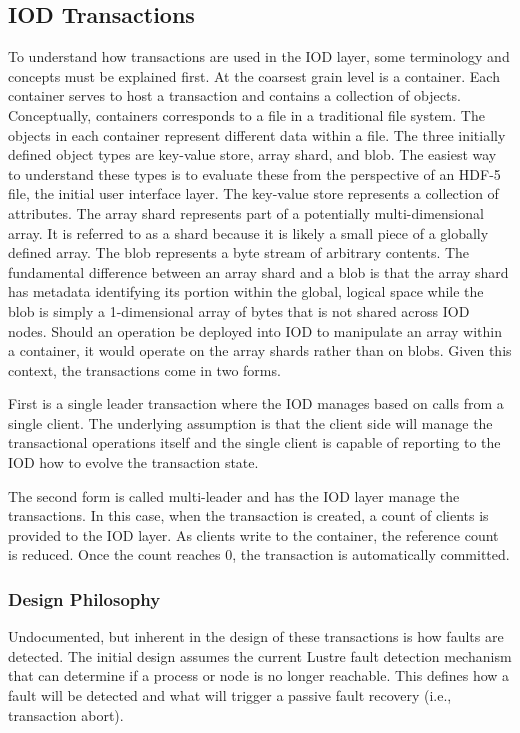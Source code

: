 \documentclass[conference]{IEEEtran}
\begin{document}
\subsection{IOD Transactions}
To understand how transactions are used in the IOD layer, some terminology and
concepts must be explained first. At the coarsest grain level is a container.
Each container serves to host a transaction and contains a collection of
objects. Conceptually, containers corresponds to a file in a traditional file
system. The objects in each container represent different data within a file.
The three initially defined object types are key-value store, array shard,
and blob. The easiest way to understand these types is to evaluate these from
the perspective of an HDF-5 file, the initial user interface layer. The
key-value store represents a collection of attributes. The array shard
represents part of a potentially multi-dimensional array. It is referred to as
a shard because it is likely a small piece of a globally defined array. The
blob represents a byte stream of arbitrary contents.  The fundamental
difference between an array shard and a blob is that the array shard has
metadata identifying its portion within the global, logical space while the
blob is simply a 1-dimensional array of bytes that is not shared across IOD
nodes.  Should an operation be deployed into IOD to manipulate an array within
a container, it would operate on the array shards rather than on blobs. Given
this context, the transactions come in two forms.

First is a single leader transaction where the IOD manages based on calls from
a single client. The underlying assumption is that the client side will manage
the transactional operations itself and the single client is capable of
reporting to the IOD how to evolve the transaction state. 

The second form is called multi-leader and has the IOD layer manage the
transactions. In this case, when the transaction is created, a count of clients
is provided to the IOD layer. As clients write to the container, the reference
count is reduced. Once the count reaches 0, the transaction is automatically
committed.

\subsubsection{Design Philosophy}
Undocumented, but inherent in the design of these transactions is how faults
are detected. The initial design assumes the current Lustre fault detection
mechanism that can determine if a process or node is no longer reachable. This
defines how a fault will be detected and what will trigger a passive fault
recovery (i.e., transaction abort).
\end{document}
